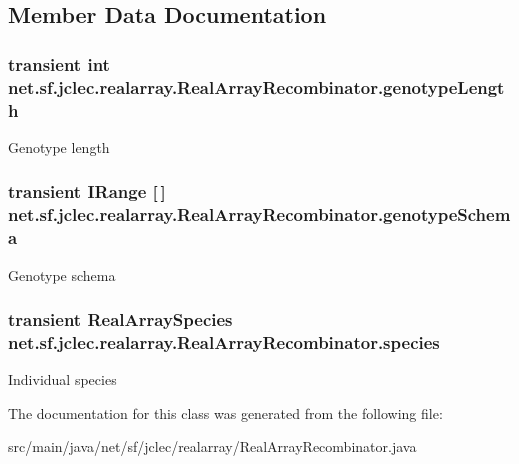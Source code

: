 \subsection{Member Data Documentation}
\hypertarget{classnet_1_1sf_1_1jclec_1_1realarray_1_1_real_array_recombinator_a531caf9fa4e3fea2cf265c149f2bba84}{
\subsubsection[{genotype\-Length}]{\setlength{\rightskip}{0pt plus 5cm}transient int net.\-sf.\-jclec.\-realarray.\-Real\-Array\-Recombinator.\-genotype\-Length\hspace{0.3cm}{\ttfamily [protected]}}}\label{classnet_1_1sf_1_1jclec_1_1realarray_1_1_real_array_recombinator_a531caf9fa4e3fea2cf265c149f2bba84}
Genotype length \hypertarget{classnet_1_1sf_1_1jclec_1_1realarray_1_1_real_array_recombinator_af292bc93c56e25baee0106d99c0dd280}{
\subsubsection[{genotype\-Schema}]{\setlength{\rightskip}{0pt plus 5cm}transient {\bf I\-Range} \mbox{[}$\,$\mbox{]} net.\-sf.\-jclec.\-realarray.\-Real\-Array\-Recombinator.\-genotype\-Schema\hspace{0.3cm}{\ttfamily [protected]}}}\label{classnet_1_1sf_1_1jclec_1_1realarray_1_1_real_array_recombinator_af292bc93c56e25baee0106d99c0dd280}
Genotype schema \hypertarget{classnet_1_1sf_1_1jclec_1_1realarray_1_1_real_array_recombinator_ac0db080ae3f70bea710914636a3a3f28}{
\subsubsection[{species}]{\setlength{\rightskip}{0pt plus 5cm}transient {\bf Real\-Array\-Species} net.\-sf.\-jclec.\-realarray.\-Real\-Array\-Recombinator.\-species\hspace{0.3cm}{\ttfamily [protected]}}}\label{classnet_1_1sf_1_1jclec_1_1realarray_1_1_real_array_recombinator_ac0db080ae3f70bea710914636a3a3f28}
Individual species 

The documentation for this class was generated from the following file\-:\begin{DoxyCompactItemize}
\item 
src/main/java/net/sf/jclec/realarray/Real\-Array\-Recombinator.\-java\end{DoxyCompactItemize}
